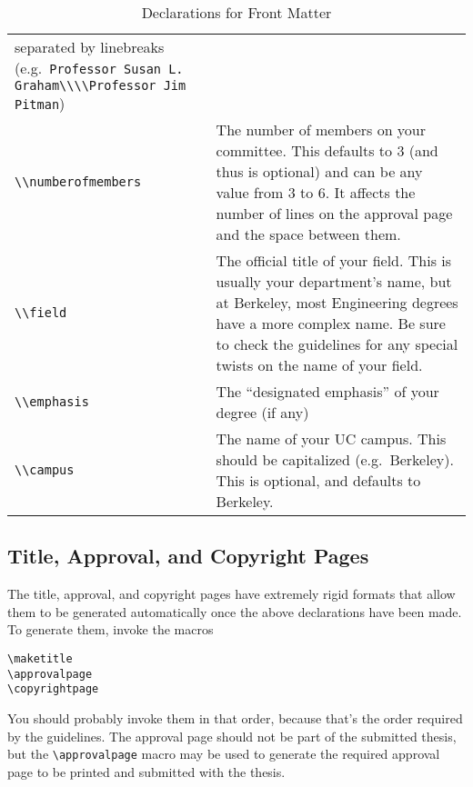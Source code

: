\documentclass[11pt]{article}
\begin{document}
\begin{table}
\begin{tabularx}{.9\textwidth}{lX}
  separated by linebreaks
  (e.g.~\lstinline!Professor Susan L. Graham\\\\Professor Jim Pitman!) \\
\lstinline|\\numberofmembers| & The number of members on your committee.
  This defaults to 3 (and thus is optional) and can be any value from
  3 to 6.  It affects the number of lines on the approval
  page and the space between them. \\
\lstinline|\\field| & The official title of your field.  This is usually
  your department's name, but at Berkeley, most
  Engineering degrees have a more complex name.
  Be sure to check the guidelines for any special
  twists on the name of your field. \\
\lstinline|\\emphasis| & The ``designated emphasis'' of your degree (if any) \\
\lstinline|\\campus| & The name of your UC campus.  This should be capitalized
  (e.g.~Berkeley).  This is optional, and defaults to Berkeley. \\
\bottomrule
\end{tabularx}
\caption{Declarations for Front Matter}\label{decls}
\end{table}

\subsection{Title, Approval, and Copyright Pages}

The title, approval, and copyright pages have extremely rigid formats
that allow them to be generated automatically once the above
declarations have been made.  To generate them, invoke the macros
\begin{lstlisting}
\maketitle
\approvalpage
\copyrightpage
\end{lstlisting}

You should probably invoke them in that order, because that's the
order required by the guidelines.  The approval page should not be part
of the submitted thesis, but the \verb|\approvalpage| macro may be used to
generate the required approval page to be printed and submitted with the
thesis.
\end{document}

